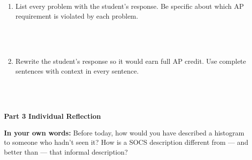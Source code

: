 \documentclass[10pt]{article}
\begin{document}
\vspace{0.12in}

\begin{enumerate}[leftmargin=1.5em, itemsep=8pt]

  \item List every problem with the student's response. Be specific about
        which AP requirement is violated by each problem.\\[5pt]
        \writeline\\[1pt]\writeline\\[1pt]\writeline\\[1pt]\writeline

  \item Rewrite the student's response so it would earn full AP credit.
        Use complete sentences with context in every sentence.\\[5pt]
        \writeline\\[1pt]\writeline\\[1pt]\writeline\\[1pt]\writeline

\end{enumerate}

\vspace{0.12in}

{\large\bfseries\color{navy} Part 3 \quad Individual Reflection}

\vspace{0.1in}

\begin{tcolorbox}[colback=goldbg, colframe=goldacc, boxrule=0.8pt, arc=2mm,
    left=3mm, right=3mm, top=2mm, bottom=2mm]
\small\textbf{In your own words:} Before today, how would you have described a
histogram to someone who hadn't seen it? How is a SOCS description different
from --- and better than --- that informal description?\\[6pt]
\writeline\\[1pt]\writeline\\[1pt]\writeline
\end{tcolorbox}
\end{document}
